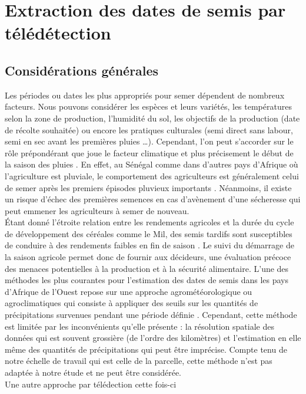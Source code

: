 \section{Extraction des dates de semis par télédétection}
  
  \subsection{Considérations générales} \label{general}
  
Les périodes ou dates les plus appropriés pour semer dépendent de nombreux facteurs.  Nous pouvons considérer les espèces et leurs variétés, les températures 
selon la zone de production, l'humidité du sol, les objectifs de la production (date de récolte souhaitée) ou encore les pratiques culturales (semi direct sans labour, semi en sec avant les premières pluies \ldots{}). Cependant, l'on peut
s'accorder sur le rôle prépondérant que joue le facteur climatique et plus précisement le début de la saison des pluies \citep{Ingram2002, Barbier2009}. En effet, au Sénégal comme dans d'autres pays d'Afrique où l'agriculture est pluviale, le comportement des agriculteurs est
généralement celui de semer après les premiers épisodes pluvieux importants \citep{Bacci1999}. Néanmoins, il existe un risque d'échec des premières semences en cas d'avènement d'une sécheresse \citep{Marteau2011} qui peut emmener les agriculteurs à semer de nouveau.\\ \'Etant donné l'étroite relation entre les rendements agricoles et la durée du cycle de développement des céréales comme le Mil, 
des semis tardifs sont susceptibles de 
conduire à des rendements faibles en fin de saison \citep{Sivakumar1990}. Le suivi du démarrage de la saison agricole permet donc de fournir aux décideurs, une évaluation précoce des menaces potentielles 
à la production et à la sécurité alimentaire. L'une des méthodes les plus courantes pour l'estimation des dates de semis dans les pays d'Afrique de l'Ouest repose sur une approche agrométéorologique ou agroclimatiques
qui consiste à appliquer des seuils sur les quantités de précipitations survenues pendant une période définie \citep{Marinho2014}. Cependant, cette méthode est limitée par les inconvénients qu'elle présente : la résolution spatiale des données qui est souvent grossière (de l'ordre des kilomètres) et l'estimation en elle même des quantités de précipitations qui peut être imprécise. 
Compte tenu de notre échelle de travail qui est celle de la parcelle, cette méthode n'est pas adaptée à notre étude et ne peut être considérée. \\Une autre approche par télédection cette fois-ci
